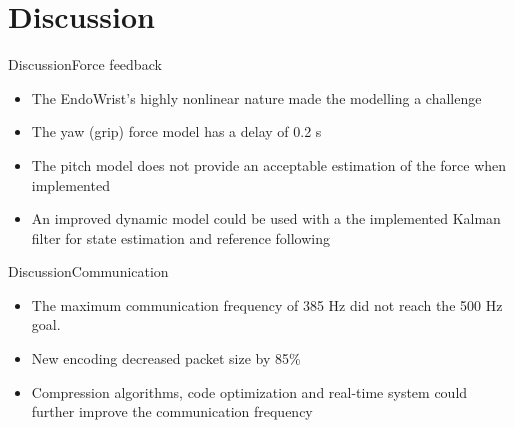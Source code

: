 \section{Discussion}

\begin{frame}{Discussion}{Force feedback}
	
	
	\begin{itemize}
		\item The EndoWrist's highly nonlinear nature made the modelling a challenge
		\item The yaw (grip) force model has a delay of 0.2 s 
		\item The pitch model does not provide an acceptable estimation of the force when implemented
		\item An improved dynamic model could be used with a the implemented Kalman filter for state estimation and reference following
	\end{itemize}
	
	
\end{frame}

\begin{frame}{Discussion}{Communication}


  \begin{itemize}
  	\item The maximum communication frequency of 385 Hz did not reach the 500 Hz goal.
  	\item New encoding  decreased packet size by 85\%
  	\item Compression algorithms, code optimization and real-time system could further improve the communication frequency

  	
   
  \end{itemize}


\end{frame}






